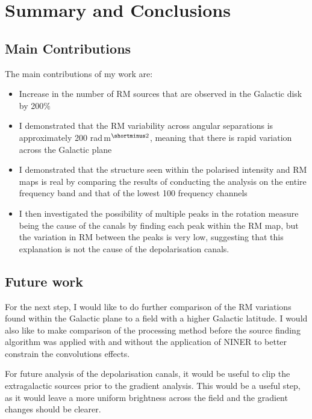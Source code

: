 \chapter{Summary and Conclusions}
\label{ch: Conclusion}

\section{Main Contributions}

The main contributions of my work are:

\begin{itemize}

\item Increase in the number of RM sources that are observed in the Galactic disk by 200$\%$

\item I demonstrated that the RM variability across angular separations is approximately 200 rad$\,$m$^{\shortminus2}$, meaning that there is rapid variation across the Galactic plane

\item I demonstrated that the structure seen within the polarised intensity and RM maps is real by comparing the results of conducting the analysis on the entire frequency band and that of the lowest 100 frequency channels

\item I then investigated the possibility of multiple peaks in the rotation measure being the cause of the canals by finding each peak within the RM map, but the variation in RM between the peaks is very low, suggesting that this explanation is not the cause of the depolarisation canals. 

\end{itemize}

\section{Future work}

For the next step, I would like to do further comparison of the RM variations found within the Galactic plane to a field with a higher Galactic latitude. I would also like to make comparison of the processing method before the source finding algorithm was applied with and without the application of NINER to better constrain the convolutions effects.

For future analysis of the depolarisation canals, it would be useful to clip the extragalactic sources prior to the gradient analysis. This would be a useful step, as it would leave a more uniform brightness across the field and the gradient changes should be clearer.

